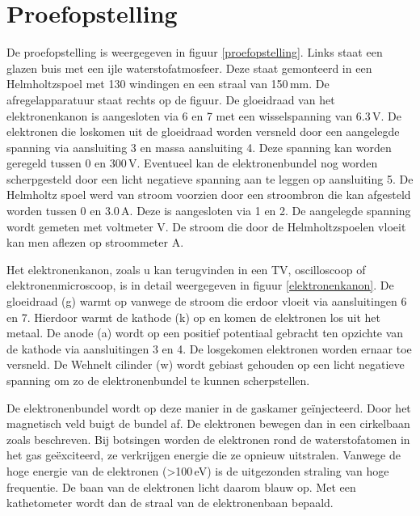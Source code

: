 \section{Proefopstelling}


De proefopstelling is weergegeven in figuur \ref{proefopstelling}. Links staat 
een glazen buis met een ijle waterstofatmosfeer. Deze staat gemonteerd in een 
Helmholtzspoel met 130 windingen en een straal van 150\,mm. De 
afregelapparatuur staat rechts op de figuur. De gloeidraad van het 
elektronenkanon is aangesloten via 6 en 7 met een wisselspanning van 6.3\,V. De 
elektronen die loskomen uit de gloeidraad worden versneld door een aangelegde 
spanning via aansluiting 3 en massa aansluiting 4. Deze spanning kan worden 
geregeld tussen 0 en 300\,V. Eventueel kan de elektronenbundel nog worden 
scherpgesteld door een licht negatieve spanning aan te leggen op aansluiting 5.  
De Helmholtz spoel werd van stroom voorzien door een stroombron die kan 
afgesteld worden tussen 0 en 3.0\,A. Deze is aangesloten via 1 en 2. De 
aangelegde spanning wordt gemeten met voltmeter V. De stroom die door de 
Helmholtzspoelen vloeit kan men aflezen op stroommeter A.


Het elektronenkanon, zoals u kan terugvinden in een TV, oscilloscoop of 
elektronenmicroscoop, is in detail weergegeven in figuur \ref{elektronenkanon}.  
De gloeidraad (g) warmt op vanwege de stroom die erdoor vloeit via 
aansluitingen 6 en 7. Hierdoor warmt de kathode (k) op en komen de elektronen 
los uit het metaal. De anode (a) wordt op een positief potentiaal gebracht ten 
opzichte van de kathode via aansluitingen 3 en 4.  De losgekomen elektronen 
worden ernaar toe versneld.  De Wehnelt cilinder (w) wordt gebiast gehouden op 
een licht negatieve spanning om zo de elektronenbundel te kunnen scherpstellen.

De elektronenbundel wordt op deze manier in de gaskamer ge\"injecteerd. Door 
het magnetisch veld buigt de bundel af. De elektronen bewegen dan in een 
cirkelbaan zoals beschreven. Bij botsingen worden de elektronen rond de 
waterstofatomen in het gas ge\"exciteerd, ze verkrijgen energie die ze opnieuw 
uitstralen. Vanwege de hoge energie van de elektronen (\textgreater100\,eV) is 
de uitgezonden straling van hoge frequentie. De baan van de elektronen licht 
daarom blauw op. Met een kathetometer wordt dan de straal van de elektronenbaan 
bepaald.
